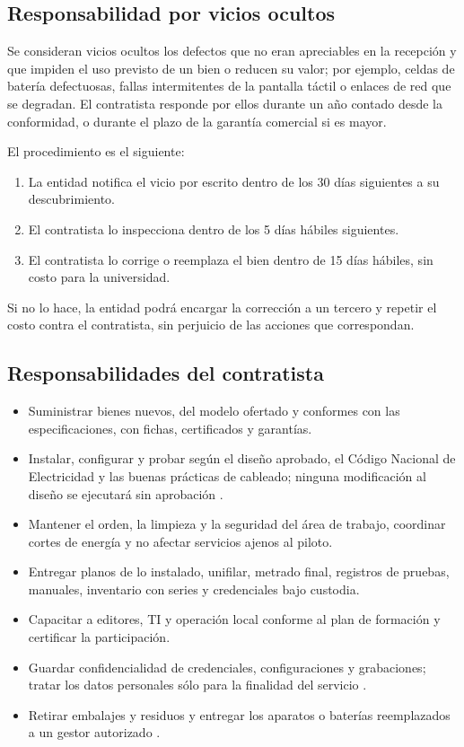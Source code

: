 \subsection{Responsabilidad por vicios ocultos}
Se consideran vicios ocultos los defectos que no eran apreciables en la recepción y que impiden el uso previsto de un bien o reducen su valor; por ejemplo, celdas de batería defectuosas, fallas intermitentes de la pantalla táctil o enlaces de red que se degradan. El contratista responde por ellos durante un año contado desde la conformidad, o durante el plazo de la garantía comercial si es mayor.

El procedimiento es el siguiente:
\begin{enumerate}
\item La entidad notifica el vicio por escrito dentro de los 30 días siguientes a su descubrimiento.
\item El contratista lo inspecciona dentro de los 5 días hábiles siguientes.
\item El contratista lo corrige o reemplaza el bien dentro de 15 días hábiles, sin costo para la universidad.
\end{enumerate}
Si no lo hace, la entidad podrá encargar la corrección a un tercero y repetir el costo contra el contratista, sin perjuicio de las acciones que correspondan.

\subsection{Responsabilidades del contratista}
\begin{itemize}
\item Suministrar bienes nuevos, del modelo ofertado y conformes con las especificaciones, con fichas, certificados y garantías.
\item Instalar, configurar y probar según el diseño aprobado, el Código Nacional de Electricidad y las buenas prácticas de cableado; ninguna modificación al diseño se ejecutará sin aprobación \cite{cne}.
\item Mantener el orden, la limpieza y la seguridad del área de trabajo, coordinar cortes de energía y no afectar servicios ajenos al piloto.
\item Entregar planos de lo instalado, unifilar, metrado final, registros de pruebas, manuales, inventario con series y credenciales bajo custodia.
\item Capacitar a editores, TI y operación local conforme al plan de formación y certificar la participación.
\item Guardar confidencialidad de credenciales, configuraciones y grabaciones; tratar los datos personales sólo para la finalidad del servicio \cite{datos}.
\item Retirar embalajes y residuos y entregar los aparatos o baterías reemplazados a un gestor autorizado \cite{raee}.
\end{itemize}

